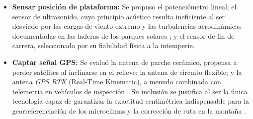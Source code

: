 \begin{itemize}
	\item \textbf{Sensar posición de plataforma:} Se propuso el potenciómetro lineal; el sensor de ultrasonido, cuyo principio acústico resulta ineficiente al ser desviado por las cargas de viento extremo y las turbulencias aerodinámicas documentadas en las laderas de los parques solares \citep{Xu2024}; y el sensor de fin de carrera, seleccionado por su fiabilidad física a la intemperie.
	
	\item \textbf{Captar señal GPS:} Se evaluó la antena de parche cerámico, propensa a perder satélites al inclinarse en el relieve; la antena de circuito flexible; y la antena \textit{GPS RTK} (Real-Time Kinematic), a menudo combinada con telemetría en vehículos de inspección \citep{CN116405876A}. Su inclusión se justifica al ser la única tecnología capaz de garantizar la exactitud centimétrica indispensable para la georreferenciación de los microclimas y la corrección de ruta en la montaña \citep{Armstrong2026, Figgis2025}.
\end{itemize}


